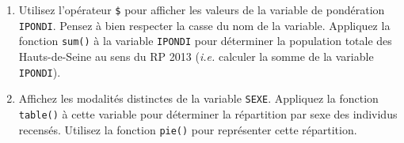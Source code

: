 \documentclass[12pt,twosided, notitlepage]{book}
\newenvironment{Shaded}{}{}
\newcommand{\KeywordTok}[1]{\textcolor[rgb]{0.00,0.00,1.00}{#1}}
\newcommand{\CommentTok}[1]{\textcolor[rgb]{0.00,0.50,0.00}{#1}}
\newcommand{\OperatorTok}[1]{#1}
\newcommand{\NormalTok}[1]{#1}
\newif \ifsol
\renewenvironment{Shaded}{\begin{snugshade}}{\end{snugshade}}
\begin{document}
\begin{enumerate}
  \begin{center} \rule{0.5\linewidth}{\linethickness}\end{center}

  \bigskip  \fi 
\item
  Utilisez l'opérateur \texttt{\$}\index{\texttt{\$}} pour afficher les
  valeurs de la variable de pondération \texttt{IPONDI}. Pensez à bien
  respecter la casse du nom de la variable. Appliquez la fonction
  \texttt{sum()} à la variable \texttt{IPONDI} pour
  déterminer la population totale des Hauts-de-Seine au sens du RP 2013
  (\emph{i.e.} calculer la somme de la variable \texttt{IPONDI}).

  \ifsol 

  \begin{center} \rule{0.5\linewidth}{\linethickness}\end{center}

\begin{Shaded}
\begin{Highlighting}[]
\CommentTok{# Affichage du contenu de la variable IPONDI}
\NormalTok{rp}\OperatorTok{$}\NormalTok{IPONDI}
\CommentTok{# Note : pour des raisons de présentation, seules les 20 premières valeurs}
\CommentTok{# sont affichées ici.}
\end{Highlighting}
\end{Shaded}

\begin{verbatim}
  ##  [1] 3.4927574 3.4927574 3.4927574 1.1016688 1.1016688 1.1016688
  ##  [7] 1.1016688 3.6388523 3.6388523 0.8573350 0.8573350 3.7741295
  ## [13] 3.7741295 3.5340019 1.0162282 1.0343014 1.0343014 0.8821233
  ## [19] 0.8821233 3.3128186
\end{verbatim}

\begin{Shaded}
\begin{Highlighting}[]
\KeywordTok{sum}\NormalTok{(rp}\OperatorTok{$}\NormalTok{IPONDI)}
\NormalTok{  ## [1] 1591365}
\CommentTok{# La population des Hauts-de-Seine au sens du RP 2013 est de}
\CommentTok{# 1 591 365 habitants.}
\end{Highlighting}
\end{Shaded}

  \begin{center} \rule{0.5\linewidth}{\linethickness}\end{center}

  \bigskip  \fi 
\item
  Affichez les modalités distinctes de la variable
  \texttt{SEXE}. Appliquez la fonction
  \texttt{table()} à cette variable pour
  déterminer la répartition par sexe des individus recensés. Utilisez la
  fonction \texttt{pie()} pour représenter cette
  répartition.


\end{enumerate}
\end{document}
